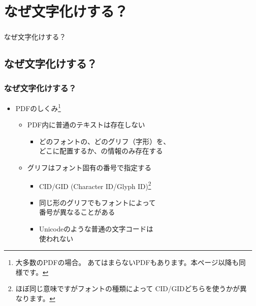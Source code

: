 \section{なぜ文字化けする？}
\begin{frame}\frametitle{}
  \centering
  なぜ文字化けする？
\end{frame}

\subsection{なぜ文字化けする？}
\begin{frame}\frametitle{なぜ文字化けする？}
  \begin{itemize}
  \item PDFのしくみ\footnote{\tiny 大多数のPDFの場合。
  あてはまらないPDFもあります。本ページ以降も同様です。}
    \begin{itemize}
    \item PDF内に普通のテキストは存在しない
      \begin{itemize}
      \item どのフォントの、どのグリフ（字形）を、 \\
        どこに配置するか、の情報のみ存在する
      \end{itemize}
    \item グリフはフォント固有の番号で指定する
      \begin{itemize}
      \item CID/GID (Character ID/Glyph ID)\footnote{\tiny
      ほぼ同じ意味ですがフォントの種類によって
      CID/GIDどちらを使うかが異なります。}
      \item 同じ形のグリフでもフォントによって \\ 番号が異なることがある
      \item Unicodeのような普通の文字コードは \\
        使われない
      \end{itemize}
    \end{itemize}
  \end{itemize}
\end{frame}

